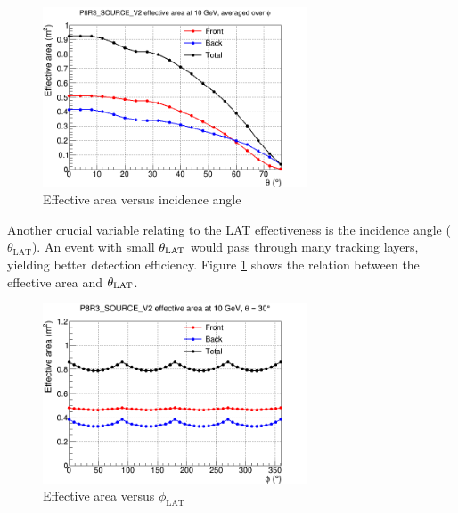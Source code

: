 \begin{figure}[h!]
    \centering
    \includegraphics[width=0.7\textwidth]{content/background/figures/eff_theta.png}
    \caption{
        Effective area versus incidence angle \citep{lat_p8_performance}
    }
    \label{fig:eff_theta}
\end{figure}

Another crucial variable relating to the LAT effectiveness
is the incidence angle ($\theta_\text{LAT}$).
An event with small $\theta_{\rm LAT}$ would pass through many
tracking layers, yielding better detection efficiency.
Figure \ref{fig:eff_theta} shows
the relation between the effective area and $\theta_{\rm LAT}$.



\begin{figure}[h!]
    \centering
    \includegraphics[width=0.7\textwidth]{content/background/figures/eff_phi.png}
    \caption{
        Effective area versus $\phi_\text{LAT}$ \citep{lat_p8_performance}
    }
    \label{fig:eff_phi}
\end{figure}


